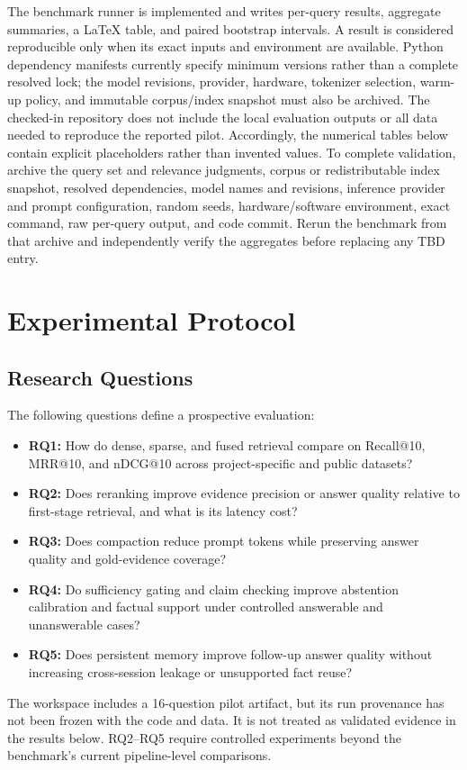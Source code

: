 \documentclass[conference]{IEEEtran}
\begin{document}
The benchmark runner is implemented and writes per-query results, aggregate
summaries, a LaTeX table, and paired bootstrap intervals. A result is considered
reproducible only when its exact inputs and environment are available. Python
dependency manifests currently specify minimum versions rather than a complete
resolved lock; the model revisions, provider, hardware, tokenizer selection,
warm-up policy, and immutable corpus/index snapshot must also be archived.
The checked-in repository does not include the local evaluation outputs or
all data needed to reproduce the reported pilot. Accordingly, the numerical
tables below contain explicit placeholders rather than invented values. To
complete validation, archive the query set and relevance judgments, corpus or
redistributable index snapshot, resolved dependencies, model names and
revisions, inference provider and prompt configuration, random seeds,
hardware/software environment, exact command, raw per-query output, and code
commit. Rerun the benchmark from that archive and independently verify the
aggregates before replacing any TBD entry.

\section{Experimental Protocol}

\subsection{Research Questions}
The following questions define a prospective evaluation:
\begin{itemize}
  \item \textbf{RQ1:} How do dense, sparse, and fused retrieval compare on
  Recall@10, MRR@10, and nDCG@10 across project-specific and public datasets?
  \item \textbf{RQ2:} Does reranking improve evidence precision or answer
  quality relative to first-stage retrieval, and what is its latency cost?
  \item \textbf{RQ3:} Does compaction reduce prompt tokens while preserving
  answer quality and gold-evidence coverage?
  \item \textbf{RQ4:} Do sufficiency gating and claim checking improve
  abstention calibration and factual support under controlled answerable and
  unanswerable cases?
  \item \textbf{RQ5:} Does persistent memory improve follow-up answer quality
  without increasing cross-session leakage or unsupported fact reuse?
\end{itemize}
The workspace includes a 16-question pilot artifact, but its run provenance
has not been frozen with the code and data. It is not treated as validated
evidence in the results below. RQ2--RQ5 require controlled experiments beyond
the benchmark's current pipeline-level comparisons.
\end{document}
